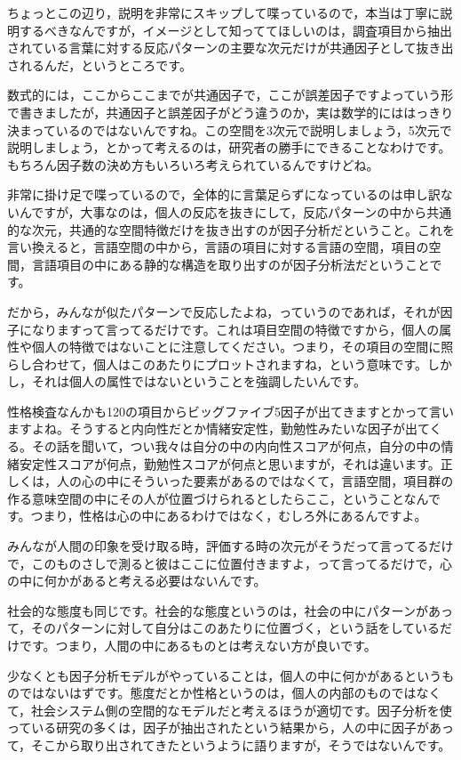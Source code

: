\documentclass{ltjsbook}
\begin{document}
ちょっとこの辺り，説明を非常にスキップして喋っているので，本当は丁寧に説明するべきなんですが，イメージとして知っててほしいのは，調査項目から抽出されている言葉に対する反応パターンの主要な次元だけが共通因子として抜き出されるんだ，というところです。

数式的には，ここからここまでが共通因子で，ここが誤差因子ですよっていう形で書きましたが，共通因子と誤差因子がどう違うのか，実は数学的にははっきり決まっているのではないんですね。この空間を3次元で説明しましょう，5次元で説明しましょう，とかって考えるのは，研究者の勝手にできることなわけです。もちろん因子数の決め方もいろいろ考えられているんですけどね。

非常に掛け足で喋っているので，全体的に言葉足らずになっているのは申し訳ないんですが，大事なのは，個人の反応を抜きにして，反応パターンの中から共通的な次元，共通的な空間特徴だけを抜き出すのが因子分析だということ。これを言い換えると，言語空間の中から，言語の項目に対する言語の空間，項目の空間，言語項目の中にある静的な構造を取り出すのが因子分析法だということです。

だから，みんなが似たパターンで反応したよね，っていうのであれば，それが因子になりますって言ってるだけです。これは項目空間の特徴ですから，個人の属性や個人の特徴ではないことに注意してください。つまり，その項目の空間に照らし合わせて，個人はこのあたりにプロットされますね，という意味です。しかし，それは個人の属性ではないということを強調したいんです。

性格検査なんかも120の項目からビッグファイブ5因子が出てきますとかって言いますよね。そうすると内向性だとか情緒安定性，勤勉性みたいな因子が出てくる。その話を聞いて，つい我々は自分の中の内向性スコアが何点，自分の中の情緒安定性スコアが何点，勤勉性スコアが何点と思いますが，それは違います。正しくは，人の心の中にそういった要素があるのではなくて，言語空間，項目群の作る意味空間の中にその人が位置づけられるとしたらここ，ということなんです。つまり，性格は心の中にあるわけではなく，むしろ外にあるんですよ。

みんなが人間の印象を受け取る時，評価する時の次元がそうだって言ってるだけで，このものさしで測ると彼はここに位置付きますよ，って言ってるだけで，心の中に何かがあると考える必要はないんです。

社会的な態度も同じです。社会的な態度というのは，社会の中にパターンがあって，そのパターンに対して自分はこのあたりに位置づく，という話をしているだけです。つまり，人間の中にあるものとは考えない方が良いです。

少なくとも因子分析モデルがやっていることは，個人の中に何かがあるというものではないはずです。態度だとか性格というのは，個人の内部のものではなくて，社会システム側の空間的なモデルだと考えるほうが適切です。因子分析を使っている研究の多くは，因子が抽出されたという結果から，人の中に因子があって，そこから取り出されてきたというように語りますが，そうではないんです。
\end{document}
